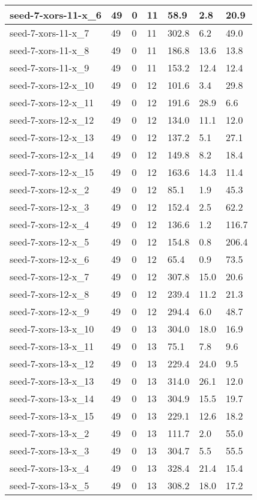\begin{scriptsize}
\begin{longtable}{|p{5cm}|l|l|l|l|l|l|}
seed-7-xors-11-x\_6&49&0&11&58.9&2.8&20.9 \\ \hline 
seed-7-xors-11-x\_7&49&0&11&302.8&6.2&49.0 \\ \hline 
seed-7-xors-11-x\_8&49&0&11&186.8&13.6&13.8 \\ \hline 
seed-7-xors-11-x\_9&49&0&11&153.2&12.4&12.4 \\ \hline 
seed-7-xors-12-x\_10&49&0&12&101.6&3.4&29.8 \\ \hline 
seed-7-xors-12-x\_11&49&0&12&191.6&28.9&6.6 \\ \hline 
seed-7-xors-12-x\_12&49&0&12&134.0&11.1&12.0 \\ \hline 
seed-7-xors-12-x\_13&49&0&12&137.2&5.1&27.1 \\ \hline 
seed-7-xors-12-x\_14&49&0&12&149.8&8.2&18.4 \\ \hline 
seed-7-xors-12-x\_15&49&0&12&163.6&14.3&11.4 \\ \hline 
seed-7-xors-12-x\_2&49&0&12&85.1&1.9&45.3 \\ \hline 
seed-7-xors-12-x\_3&49&0&12&152.4&2.5&62.2 \\ \hline 
seed-7-xors-12-x\_4&49&0&12&136.6&1.2&116.7 \\ \hline 
seed-7-xors-12-x\_5&49&0&12&154.8&0.8&206.4 \\ \hline 
seed-7-xors-12-x\_6&49&0&12&65.4&0.9&73.5 \\ \hline 
seed-7-xors-12-x\_7&49&0&12&307.8&15.0&20.6 \\ \hline 
seed-7-xors-12-x\_8&49&0&12&239.4&11.2&21.3 \\ \hline 
seed-7-xors-12-x\_9&49&0&12&294.4&6.0&48.7 \\ \hline 
seed-7-xors-13-x\_10&49&0&13&304.0&18.0&16.9 \\ \hline 
seed-7-xors-13-x\_11&49&0&13&75.1&7.8&9.6 \\ \hline 
seed-7-xors-13-x\_12&49&0&13&229.4&24.0&9.5 \\ \hline 
seed-7-xors-13-x\_13&49&0&13&314.0&26.1&12.0 \\ \hline 
seed-7-xors-13-x\_14&49&0&13&304.9&15.5&19.7 \\ \hline 
seed-7-xors-13-x\_15&49&0&13&229.1&12.6&18.2 \\ \hline 
seed-7-xors-13-x\_2&49&0&13&111.7&2.0&55.0 \\ \hline 
seed-7-xors-13-x\_3&49&0&13&304.7&5.5&55.5 \\ \hline 
seed-7-xors-13-x\_4&49&0&13&328.4&21.4&15.4 \\ \hline 
seed-7-xors-13-x\_5&49&0&13&308.2&18.0&17.2 \\ \hline 

\end{longtable}
\end{scriptsize}
